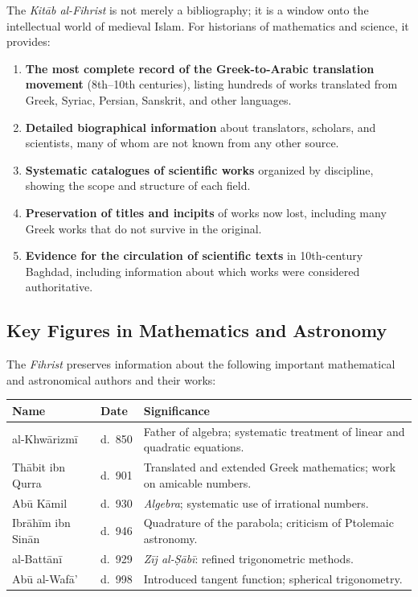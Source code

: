 \documentclass[11pt,a4paper]{article}
\begin{document}
The \textit{Kit\=ab al-Fihrist} is not merely a bibliography; it is a
window onto the intellectual world of medieval Islam. For historians of
mathematics and science, it provides:

\begin{enumerate}
  \item \textbf{The most complete record of the Greek-to-Arabic translation
    movement} (8th--10th centuries), listing hundreds of works translated
    from Greek, Syriac, Persian, Sanskrit, and other languages.

  \item \textbf{Detailed biographical information} about translators,
    scholars, and scientists, many of whom are not known from any other
    source.

  \item \textbf{Systematic catalogues of scientific works} organized by
    discipline, showing the scope and structure of each field.

  \item \textbf{Preservation of titles and incipits} of works now lost,
    including many Greek works that do not survive in the original.

  \item \textbf{Evidence for the circulation of scientific texts} in
    10th-century Baghdad, including information about which works were
    considered authoritative.
\end{enumerate}

\subsection{Key Figures in Mathematics and Astronomy}

The \textit{Fihrist} preserves information about the following
important mathematical and astronomical authors and their works:

\begin{longtable}{@{}>{\raggedright\arraybackslash}p{3.5cm}p{2cm}p{6.5cm}@{}}
\toprule
\textbf{Name} & \textbf{Date} & \textbf{Significance} \\
\midrule
\endhead
al-Khw\=arizm\=i & d.~850 & 
Father of algebra; systematic treatment of linear and quadratic
equations. \\
\addlinespace
Th\=abit ibn Qurra & d.~901 & 
Translated and extended Greek mathematics; work on amicable numbers. \\
\addlinespace
Ab\=u K\=amil & d.~930 & 
\textit{Algebra}; systematic use of irrational numbers. \\
\addlinespace
Ibr\=ah\=im ibn Sin\=an & d.~946 & 
Quadrature of the parabola; criticism of Ptolemaic astronomy. \\
\addlinespace
al-Batt\=an\=i & d.~929 & 
\textit{Z\=ij al-\d{S}\=ab\=i}: refined trigonometric methods. \\
\addlinespace
Ab\=u al-Waf\=a' & d.~998 & 
Introduced tangent function; spherical trigonometry. \\
\bottomrule
\end{longtable}
\end{document}
